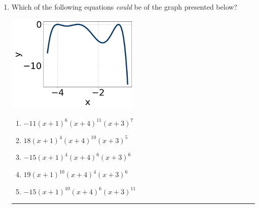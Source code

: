 \documentclass[14pt]{extbook}
\newcommand{\litem}[1]{\item#1\hspace*{-1cm}\rule{\textwidth}{0.4pt}}
\begin{document}
\begin{enumerate}
{\begin{enumerate}[label=\Alph*.]
\end{enumerate} }
\litem{
Which of the following equations \textit{could} be of the graph presented below?
\begin{center}
    \includegraphics[width=0.5\textwidth]{../Figures/polyGraphToFunctionCopyA.png}
\end{center}
\begin{enumerate}[label=\Alph*.]
\item \( -11(x + 1)^{6} (x + 4)^{11} (x + 3)^{7} \)
\item \( 18(x + 1)^{4} (x + 4)^{10} (x + 3)^{5} \)
\item \( -15(x + 1)^{4} (x + 4)^{6} (x + 3)^{6} \)
\item \( 19(x + 1)^{10} (x + 4)^{4} (x + 3)^{6} \)
\item \( -15(x + 1)^{10} (x + 4)^{6} (x + 3)^{11} \)

\end{enumerate} }
\end{enumerate}
\end{document}
